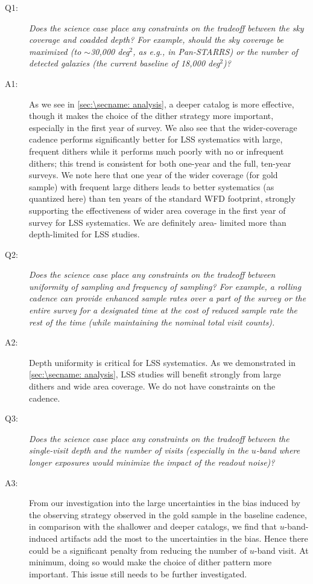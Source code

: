 \begin{description}

\item[Q1:] {\it Does the science case place any constraints on the
tradeoff between the sky coverage and coadded depth? For example, should
the sky coverage be maximized (to $\sim$30,000 deg$^2$, as e.g., in
Pan-STARRS) or the number of detected galaxies (the current baseline 
of 18,000 deg$^2$)?}

\item[A1:] As we see in \autoref{sec:\secname: analysis}, a deeper
catalog is more effective, though it makes the choice of the dither
strategy more important, especially in the first year of survey. We also see
that the wider-coverage cadence  performs
significantly better for LSS systematics with large, frequent dithers
while it performs much poorly with no or infrequent dithers; this
trend is consistent for both one-year and the full, ten-year surveys. We
note here that one year of the wider coverage (for gold sample) with frequent large
dithers leads to better systematics (as quantized here) than ten years of
the standard WFD  footprint, strongly supporting the effectiveness of wider area
coverage in the first year of survey for LSS systematics. We are definitely area-
limited more than depth-limited for LSS studies.

\item[Q2:] {\it Does the science case place any constraints on the
tradeoff between uniformity of sampling and frequency of  sampling? For
example, a rolling cadence can provide enhanced sample rates over a part
of the survey or the entire survey for a designated time at the cost of
reduced sample rate the rest of the time (while maintaining the nominal
total visit counts).}

\item[A2:] Depth uniformity is critical for LSS systematics. As we
demonstrated in \autoref{sec:\secname: analysis}, LSS studies will benefit
strongly from large dithers and wide area coverage. We do not have constraints
on the cadence.

\item[Q3:] {\it Does the science case place any constraints on the
tradeoff between the single-visit depth and the number of visits
(especially in the $u$-band where longer exposures would minimize the
impact of the readout noise)?}

\item[A3:] From our investigation into the large uncertainties in the bias induced by
the observing strategy observed in the gold sample in the baseline cadence, in
comparison with the shallower and deeper catalogs, we find that
$u$-band-induced artifacts add the most to the uncertainties in the
bias. Hence there could be a significant penalty from reducing the
number of $u$-band visit. At minimum, doing so would make the choice of
dither pattern more important. This issue still needs to be further
investigated.


\end{description}
